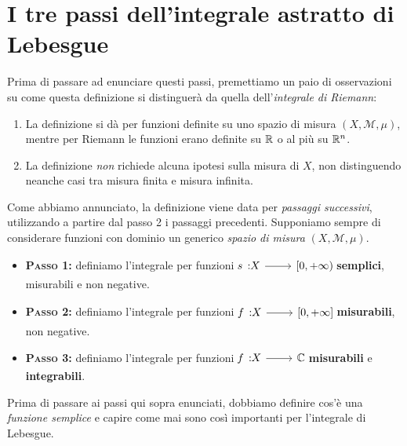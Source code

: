 \section{I tre passi dell'integrale astratto di Lebesgue}
Prima di passare ad enunciare questi passi, premettiamo un paio di osservazioni su come questa definizione si distinguerà da quella dell'\textit{integrale di Riemann}:
\begin{enumerate}
	\item La definizione si dà per funzioni definite su uno spazio di misura $\left(X,\mathcal{M},\mu\right)$, mentre per Riemann le funzioni erano definite su $\mathbb{R}$ o al più su $\mathbb{R}^n$.	
	\item La definizione \textit{non} richiede alcuna ipotesi sulla misura di $X$, non distinguendo neanche casi tra misura finita e misura infinita.
\end{enumerate}
Come abbiamo annunciato, la definizione viene data per \textit{passaggi successivi}, utilizzando a partire dal passo 2 i passaggi precedenti. Supponiamo sempre di considerare funzioni con dominio un generico \textit{spazio di misura} $\left(X,\mathcal{M},\mu\right)$.
\begin{itemize}
	\item \textbf{\textsc{Passo 1:}} definiamo l'integrale per funzioni $\funz{s}{X}{\left[0,+\infty\right)}$ \textbf{semplici}, misurabili e non negative.
	\item \textbf{\textsc{Passo 2:}} definiamo l'integrale per funzioni
	$\funz{f}{X}{\left[0,+\infty\right]}$ \textbf{misurabili}, non negative.
	\item \textbf{\textsc{Passo 3:}} definiamo l'integrale per funzioni $\funz{f}{X}{\complexset}$ \textbf{misurabili} e \textbf{integrabili}.
\end{itemize}
Prima di passare ai passi qui sopra enunciati, dobbiamo definire cos'è una \textit{funzione semplice} e capire come mai sono così importanti per l'integrale di Lebesgue.
